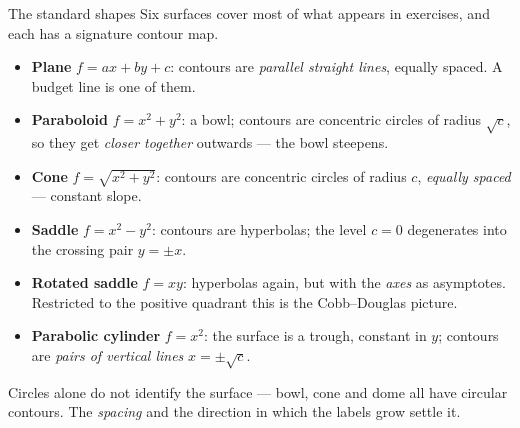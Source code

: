 \begin{rulebox}{The standard shapes}
Six surfaces cover most of what appears in exercises, and each has a
signature contour map.
\begin{itemize}[leftmargin=1.6em,itemsep=0.3ex]
  \item \textbf{Plane} $f=ax+by+c$: contours are \emph{parallel straight
        lines}, equally spaced. A budget line is one of them.
  \item \textbf{Paraboloid} $f=x^{2}+y^{2}$: a bowl; contours are
        concentric circles of radius $\sqrt{c}$, so they get
        \emph{closer together} outwards --- the bowl steepens.
  \item \textbf{Cone} $f=\sqrt{x^{2}+y^{2}}$: contours are concentric
        circles of radius $c$, \emph{equally spaced} --- constant slope.
  \item \textbf{Saddle} $f=x^{2}-y^{2}$: contours are hyperbolas; the level
        $c=0$ degenerates into the crossing pair $y=\pm x$.
  \item \textbf{Rotated saddle} $f=xy$: hyperbolas again, but with the
        \emph{axes} as asymptotes. Restricted to the positive quadrant this
        is the Cobb--Douglas picture.
  \item \textbf{Parabolic cylinder} $f=x^{2}$: the surface is a trough,
        constant in $y$; contours are \emph{pairs of vertical lines}
        $x=\pm\sqrt{c}$.
\end{itemize}
Circles alone do not identify the surface --- bowl, cone and dome all have
circular contours. The \emph{spacing} and the direction in which the labels
grow settle it.
\end{rulebox}

